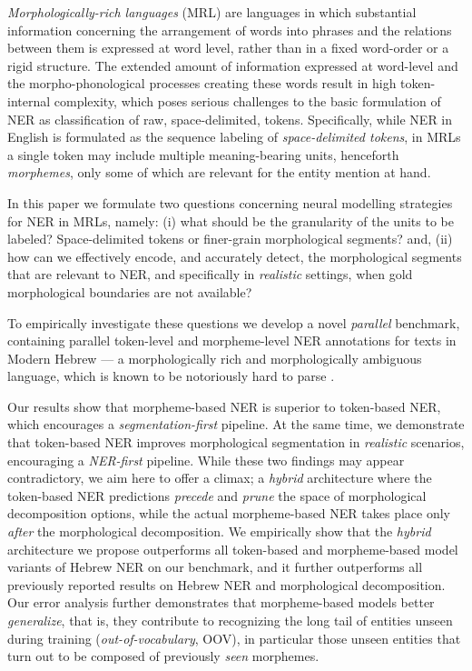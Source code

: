 \documentclass[11pt,a4paper]{article}
\begin{document}
{\em Morphologically-rich languages} (MRL) \cite{tsarfaty-etal-2010-statistical,seddah13,tsarfaty-etal-2020-spmrl}  are languages in which substantial information concerning the arrangement of words into phrases and the relations between them  is expressed at word level, rather than in a fixed word-order or a rigid structure. The extended amount of information expressed at word-level and the  morpho-phonological processes creating these  words  result in high token-internal complexity, which poses serious challenges to the basic formulation of NER as  classification of raw, {space-delimited, tokens}.
Specifically, while NER in English is formulated as the sequence labeling of {\em space-delimited tokens}, in MRLs a single token may include multiple meaning-bearing units, henceforth {\em morphemes}, only some of which are relevant for the entity mention at hand. 

In this paper we formulate two questions concerning neural modelling strategies for NER in MRLs, namely: (i) what should be the granularity of the  units to be labeled? Space-delimited tokens or finer-grain morphological segments? and, (ii) how can we  effectively encode, and accurately detect, the morphological segments that are relevant to NER,   and specifically in {\em realistic} settings, when  gold morphological boundaries are not available?
 
To empirically investigate  these questions
we  develop  a novel {\em parallel} benchmark, containing parallel token-level and morpheme-level NER annotations for texts in Modern Hebrew --- a morphologically rich and morphologically ambiguous language,
which is known to be notoriously hard to parse \cite{more-etal-2019-joint,tsarfaty-etal-2019-whats}. 

Our results  show that morpheme-based NER is superior to token-based NER, which encourages a {\em segmentation-first} pipeline. 
At the same time, we  demonstrate that token-based NER {improves}  morphological segmentation in {\em realistic} scenarios, encouraging a {\em NER-first} pipeline. While these two findings may appear contradictory, we aim here to offer a climax;  
a {\em hybrid} architecture where the token-based NER predictions {\em precede} and  {\em prune} the space of morphological decomposition options, while the actual morpheme-based NER  takes place only {\em after} the morphological decomposition.
We empirically show that the {\em hybrid} architecture we propose outperforms all token-based and morpheme-based model variants of Hebrew NER on our benchmark, and it further outperforms all previously reported results on Hebrew NER and morphological decomposition.
Our  error analysis further demonstrates that morpheme-based models  better {\em generalize}, that is, they contribute to recognizing the long tail of  entities unseen during training ({\em out-of-vocabulary}, OOV), in particular those unseen entities that turn out to be  composed of previously {\em seen} morphemes.
\end{document}
